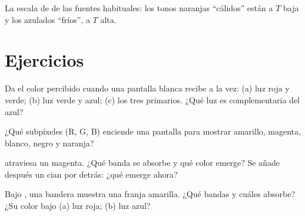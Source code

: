 \begin{omfigure}

{\small La escala de  de las fuentes habituales: los
tonos naranjas ``cálidos'' están a $T$ baja y los azulados ``fríos'', a
$T$ alta.}
\end{omfigure}

\section{Ejercicios}

\begin{exercise}[$\star$]\label{exo:g11:color-light-sources:1}
Da el color percibido cuando una pantalla blanca recibe a la vez: (a)
luz roja y verde; (b) luz verde y azul; (c) los tres primarios. ¿Qué luz
es complementaria del azul?
\end{exercise}

\begin{exercise}[$\star$]\label{exo:g11:color-light-sources:2}
¿Qué subpíxeles (R, G, B) enciende una pantalla para mostrar amarillo,
magenta, blanco, negro y naranja?
\end{exercise}

\begin{exercise}[$\star$]\label{exo:g11:color-light-sources:3}
 atraviesa un  magenta. ¿Qué banda se absorbe y qué
color emerge? Se añade después un  cian por detrás: ¿qué emerge
ahora?
\end{exercise}

\begin{exercise}[$\star$]\label{exo:g11:color-light-sources:4}
Bajo , una bandera muestra una franja amarilla. ¿Qué bandas
 y cuáles absorbe? ¿Su color bajo (a) luz roja; (b) luz azul?
\end{exercise}

